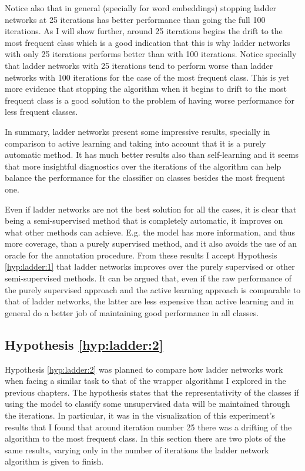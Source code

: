 Notice also that in general (specially for word embeddings) stopping ladder
networks at 25 iterations has better performance than going the full 100
iterations. As I will show further, around 25 iterations begins the drift to
the most frequent class which is a good indication that this is why ladder
networks with only 25 iterations performs better than with 100 iterations.
Notice specially that ladder networks with 25 iterations tend to perform worse
than ladder networks with 100 iterations for the case of the most frequent
class. This is yet more evidence that stopping the algorithm when it begins to
drift to the most frequent class is a good solution to the problem of having
worse performance for less frequent classes.

In summary, ladder networks present some impressive results, specially in
comparison to active learning and taking into account that it is a purely
automatic method. It has much better results also than self-learning and it
seems that more insightful diagnostics over the iterations of the algorithm can
help balance the performance for the classifier on classes besides the most
frequent one. 

Even if ladder networks are not the best solution for all the cases, it is
clear that being a semi-supervised method that is completely automatic, it
improves on what other methods can achieve. E.g. the model has more
information, and thus more coverage, than a purely supervised method, and it
also avoids the use of an oracle for the annotation procedure. From these
results I accept Hypothesis \ref{hyp:ladder:1} that ladder networks improves
over the purely supervised or other semi-supervised methods. It can be argued
that, even if the raw performance of the purely supervised approach and the
active learning approach is comparable to that of ladder networks, the latter
are less expensive than active learning and in general do a better job of
maintaining good performance in all classes.

\subsection{Hypothesis \ref{hyp:ladder:2}}\label{sec:ladder:hyp:2}

Hypothesis \ref{hyp:ladder:2} was planned to compare how ladder networks work
when facing a similar task to that of the wrapper algorithms I explored in the
previous chapters. The hypothesis states that the representativity of the
classes if using the model to classify some unsupervised data will be
maintained through the iterations. In particular, it was in the visualization
of this experiment's results that I found that around iteration number 25 there
was a drifting of the algorithm to the most frequent class. In this section
there are two plots of the same results, varying only in the number of
iterations the ladder network algorithm is given to finish.

